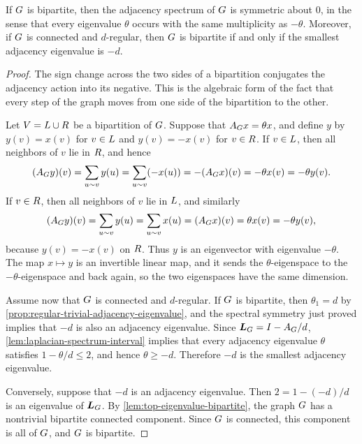 \begin{lemma}
	\label{lem:bipartite-adjacency-symmetry}
	If \(G\) is bipartite, then the adjacency spectrum of \(G\) is symmetric about \(0\), in the sense that every eigenvalue \(\theta\) occurs with the same multiplicity as \(-\theta\). Moreover, if \(G\) is connected and \(d\)-regular, then \(G\) is bipartite if and only if the smallest adjacency eigenvalue is \(-d\).
\end{lemma}

\begin{proof}
	The sign change across the two sides of a bipartition conjugates the adjacency action into its negative. This is the algebraic form of the fact that every step of the graph moves from one side of the bipartition to the other.

	Let \(V=L\cup R\) be a bipartition of \(G\). Suppose that \(A_{G}x=\theta x\), and define \(y\) by \(y(v)=x(v)\) for \(v\in L\) and \(y(v)=-x(v)\) for \(v\in R\). If \(v\in L\), then all neighbors of \(v\) lie in \(R\), and hence
	\begin{equation}
		(A_{G}y)(v)=\sum_{u\sim v}y(u)=\sum_{u\sim v}(-x(u))=-(A_{G}x)(v)=-\theta x(v)=-\theta y(v).
	\end{equation}
	If \(v\in R\), then all neighbors of \(v\) lie in \(L\), and similarly
	\begin{equation}
		(A_{G}y)(v)=\sum_{u\sim v}y(u)=\sum_{u\sim v}x(u)=(A_{G}x)(v)=\theta x(v)=-\theta y(v),
	\end{equation}
	because \(y(v)=-x(v)\) on \(R\). Thus \(y\) is an eigenvector with eigenvalue \(-\theta\). The map \(x\mapsto y\) is an invertible linear map, and it sends the \(\theta\)-eigenspace to the \(-\theta\)-eigenspace and back again, so the two eigenspaces have the same dimension.

	Assume now that \(G\) is connected and \(d\)-regular. If \(G\) is bipartite, then \(\theta_1=d\) by \cref{prop:regular-trivial-adjacency-eigenvalue}, and the spectral symmetry just proved implies that \(-d\) is also an adjacency eigenvalue. Since \(\boldsymbol{L}_{G}=I-A_{G}/d\), \cref{lem:laplacian-spectrum-interval} implies that every adjacency eigenvalue \(\theta\) satisfies \(1-\theta/d\leq 2\), and hence \(\theta\geq -d\). Therefore \(-d\) is the smallest adjacency eigenvalue.

	Conversely, suppose that \(-d\) is an adjacency eigenvalue. Then \(2=1-(-d)/d\) is an eigenvalue of \(\boldsymbol{L}_{G}\). By \cref{lem:top-eigenvalue-bipartite}, the graph \(G\) has a nontrivial bipartite connected component. Since \(G\) is connected, this component is all of \(G\), and \(G\) is bipartite.
\end{proof}

